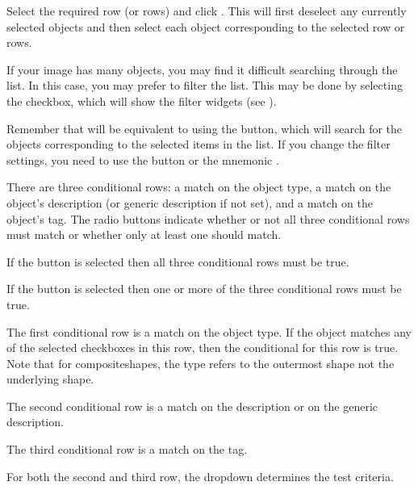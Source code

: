 Select the required row (or rows) and
click .  This will first deselect any currently selected
\glspl{object} and then select each object corresponding to the
selected row or rows.


If your image has many \glspl{object}, you may find it difficult
searching through the list. In this case, you may prefer to filter
the list. This may be done by selecting the 
checkbox, which will show the filter widgets (see ).

\begin{important}
Remember that  will be equivalent to using the
 button, which will search for the \glspl{object}
corresponding to the selected items in the list. If you change the
filter settings, you need to use the  button or the
mnemonic .
\end{important}

There are three conditional rows: a match on the object type, a
match on the object's description (or generic description if not
set), and a match on the object's tag. The 
radio buttons indicate whether or not all three conditional rows
must match or whether only at least one should match.

If the  button is selected then
all three conditional rows must be true.

If the  button is selected then
one or more of the three conditional rows must be true.

The first conditional row is a match on the object type. If the
object matches any of the selected checkboxes in this row, then the
conditional for this row is true. Note that for
\glspl{compositeshape}, the type refers to the outermost shape not
the underlying shape.

The second conditional row is a match on the description or on the
generic description. 

The third conditional row is a match on the tag. 

For both the second and third row, the 
 \gls{dropdown} determines
the test criteria.

